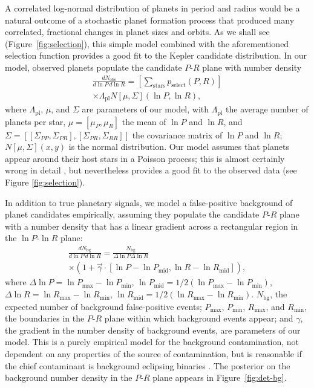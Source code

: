 \documentclass[apjl]{emulateapj}
\newcommand{\Rpl}{\Lambda_\mathrm{pl}}
\newcommand{\Nbg}{N_\mathrm{bg}}
\begin{document}
A correlated log-normal distribution of planets in period and radius
would be a natural outcome of a stochastic planet formation process
that produced many correlated, fractional changes in planet sizes and
orbits.  As we shall see (Figure\ \ref{fig:selection}), this simple
model combined with the aforementioned selection function provides a
good fit to the Kepler candidate distribution.  In our model, observed
planets populate the candidate $P$-$R$ plane with number density
\begin{multline}
  \label{eq:foreground-rate}
  \frac{dN_\mathrm{obs}}{d\ln P\, d\ln R} = \left[ \sum_\mathrm{stars}
    p_\mathrm{select}(P, R) \right] \\ \times \Rpl N\left[ \mu, \Sigma
    \right]\left( \ln P, \ln R \right),
\end{multline}
where $\Rpl$, $\mu$, and $\Sigma$ are parameters of our model, with
$\Rpl$ the average number of planets per star, $\mu = \left[ \mu_P,
  \mu_R \right]$ the mean of $\ln P$ and $\ln R$, and $\Sigma = \left[
  \left[ \Sigma_{PP}, \Sigma_{PR} \right], \left[ \Sigma_{PR},
    \Sigma_{RR} \right]\right]$ the covariance matrix of $\ln P$ and
$\ln R$; $N\left[ \mu, \Sigma \right](x,y)$ is the normal
distribution.  Our model assumes that planets appear around their host
stars in a Poisson process; this is almost certainly wrong in detail
\citep{Weissbein2012}, but nevertheless provides a good fit to the
observed data (see Figure \ref{fig:selection}).

In addition to true planetary signals, we model a false-positive
background of planet candidates empirically, assuming they populate
the candidate $P$-$R$ plane with a number density that has a linear
gradient across a rectangular region in the $\ln P$-$\ln R$ plane:
\begin{multline}
  \label{eq:background-rate}
  \frac{d\Nbg}{d \ln P \, d \ln R} = \frac{\Nbg}{\Delta \ln P \Delta
    \ln R} \\ \times \left( 1 + \vec{\gamma} \cdot \left[ \ln P - \ln P_\mathrm{mid} , \ln
    R - \ln R_\mathrm{mid} \right] \right),
\end{multline}
where $\Delta \ln P = \ln P_\mathrm{max} - \ln P_\mathrm{min}$,
$\ln P_\mathrm{mid} = 1/2\left(\ln P_\mathrm{max} - \ln P_\mathrm{min}
\right)$,
$\Delta \ln R = \ln R_\mathrm{max} - \ln R_\mathrm{min}$,
$\ln R_\mathrm{mid} = 1/2\left(\ln R_\mathrm{max} - \ln R_\mathrm{min}
\right)$.
$\Nbg$, the expected number of background false-positive events;
$P_\mathrm{max}$, $P_\mathrm{min}$, $R_\mathrm{max}$, and
$R_\mathrm{min}$, the boundaries in the $P$-$R$ plane within which
background events appear; and $\gamma$, the gradient in the number
density of background events, are parameters of our model.  This is a
purely empirical model for the background contamination, not dependent
on any properties of the source of contamination, but is reasonable if
the chief contaminant is background eclipsing binaries
\citep{Morton2011,Fressin2013,Duquennoy1991}.  The posterior on the
background number density in the $P$-$R$ plane appears in Figure\
\ref{fig:det-bg}.
\end{document}
